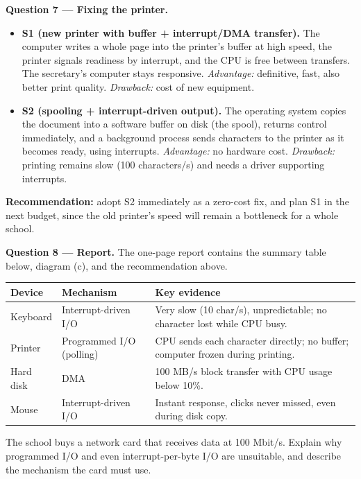 \documentclass[11pt]{article}
\newcommand{\cle}[1]{{\popxbold\color{popdark}#1}}
\begin{document}
\textbf{Question 7 --- Fixing the printer.}
\begin{itemize}
\item \textbf{S1 (new printer with buffer + interrupt/DMA transfer).} The computer writes a whole page into the printer's buffer at high speed, the printer signals readiness by interrupt, and the CPU is free between transfers. The secretary's computer stays responsive. \emph{Advantage:} definitive, fast, also better print quality. \emph{Drawback:} cost of new equipment.
\item \textbf{S2 (spooling + interrupt-driven output).} The operating system copies the document into a software buffer on disk (the \cle{spool}), returns control immediately, and a background process sends characters to the printer as it becomes ready, using interrupts. \emph{Advantage:} no hardware cost. \emph{Drawback:} printing remains slow (100 characters/s) and needs a driver supporting interrupts.
\end{itemize}
\textbf{Recommendation:} adopt S2 immediately as a zero-cost fix, and plan S1 in the next budget, since the old printer's speed will remain a bottleneck for a whole school.

\textbf{Question 8 --- Report.} The one-page report contains the summary table below, diagram (c), and the recommendation above.

\begin{center}
\begin{tabularx}{\linewidth}{|l|l|X|}
\hline
\rowcolor{popblueL} \textbf{Device} & \textbf{Mechanism} & \textbf{Key evidence} \\
\hline
Keyboard & Interrupt-driven I/O & Very slow (10 char/s), unpredictable; no character lost while CPU busy. \\
\hline
Printer & Programmed I/O (polling) & CPU sends each character directly; no buffer; computer frozen during printing. \\
\hline
Hard disk & DMA & 100 MB/s block transfer with CPU usage below 10\%. \\
\hline
Mouse & Interrupt-driven I/O & Instant response, clicks never missed, even during disk copy. \\
\hline
\end{tabularx}
\end{center}

\begin{exercice}
The school buys a network card that receives data at 100 Mbit/s. Explain why programmed I/O and even interrupt-per-byte I/O are unsuitable, and describe the mechanism the card must use.
\end{exercice}
\end{document}
